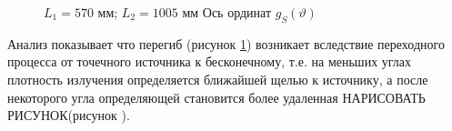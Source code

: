 \begin{figure}[H]
 \centering
 \hfill
 \hfill
 \hfill
 \caption{$L_1 = 570$ мм; $L_2 = 1005 $ мм \textcolor{mygreen}{ Ось ординат $g_S(\vartheta)$}}
 \label{ris:calc_slits_ability_res}
\end{figure}

Анализ показывает что перегиб (рисунок \ref{ris:calc_slits_ability_res}) возникает вследствие переходного
процесса от точечного источника к бесконечному, т.е. на меньших углах плотность излучения определяется ближайшей
щелью к источнику, а после некоторого угла определяющей становится более удаленная \textcolor{mygreen}{НАРИСОВАТЬ РИСУНОК}(рисунок ).
